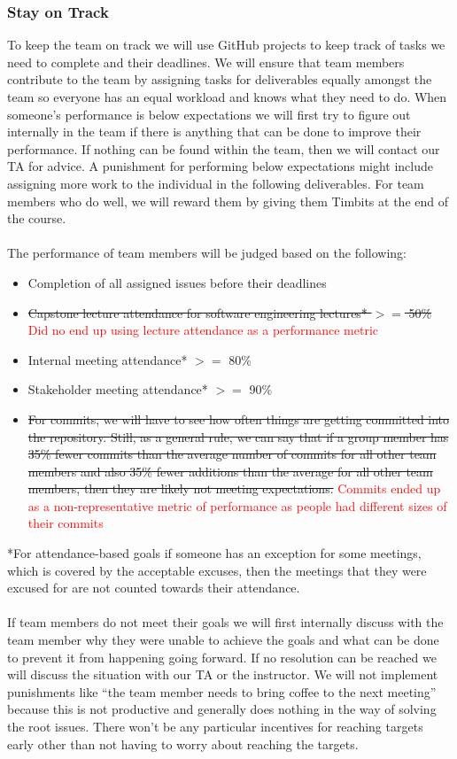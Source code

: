 \documentclass{article}
\begin{document}
\subsubsection*{Stay on Track}

To keep the team on track we will use GitHub projects to keep track
of tasks we need to complete and their
deadlines. We will ensure that team members contribute to the team by
assigning tasks for deliverables
equally amongst the team so everyone has an equal workload and knows
what they need to do. When
someone’s performance is below expectations we will first try to
figure out internally in the team if there is
anything that can be done to improve their performance. If nothing
can be found within the team, then we
will contact our TA for advice. A punishment for performing below
expectations might include assigning more
work to the individual in the following deliverables. For team
members who do well, we will reward them by
giving them Timbits at the end of the course.\\
\\
The performance of team members will be judged based on the following:
\begin{itemize}
  \item Completion of all assigned issues before their deadlines
  \item \sout{Capstone lecture attendance for software engineering
    lectures* $>=$ 50\%} \textcolor{red}{Did no end up using lecture
    attendance as a performance metric}
  \item Internal meeting attendance* $>=$ 80\%
  \item Stakeholder meeting attendance* $>=$ 90\%
  \item \sout{For commits, we will have to see how often things are
      getting committed into the repository. Still, as a
      general rule, we can say that if a group member has 35\% fewer
      commits than the average number of
      commits for all other team members and also 35\% fewer
      additions than the average for all other team
    members, then they are likely not meeting expectations.}
    \textcolor{red}{Commits ended up as a non-representative metric
    of performance as people had different sizes of their commits}
\end{itemize}
*For attendance-based goals if someone has an exception for some
meetings, which is covered by the
acceptable excuses, then the meetings that they were excused for are
not counted towards their attendance.\\
\\
If team members do not meet their goals we will first internally
discuss with the team member why they were
unable to achieve the goals and what can be done to prevent it from
happening going forward. If no
resolution can be reached we will discuss the situation with our TA
or the instructor. We will not implement
punishments like “the team member needs to bring coffee to the next
meeting” because this is not productive
and generally does nothing in the way of solving the root issues.
There won’t be any particular incentives for
reaching targets early other than not having to worry about reaching
the targets.
\end{document}
